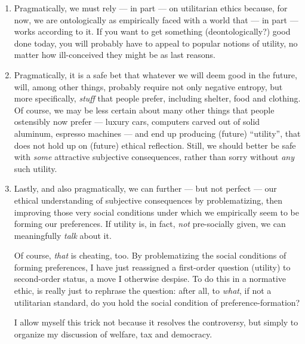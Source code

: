 \begin{enumerate}

	\item 
		Pragmatically, we must rely --- in part --- on utilitarian ethics because, for now, we are ontologically as empirically faced with a world that --- in part --- works according to it.
		If you want to get something (deontologically?) good done today, you will probably have to appeal to popular notions of utility, no matter how ill-conceived they might be as last reasons.

	\item
		Pragmatically, it is a safe bet that whatever we will deem good in the future, will, among other things, probably require not only negative entropy, but more specifically, \emph{stuff} that people prefer, including shelter, food and clothing. 
		Of course, we may be less certain about many other things that people ostensibly now prefer --- luxury cars, computers carved out of solid aluminum, espresso machines --- and end up producing (future) ``utility'', that does not hold up on (future) ethical reflection.
		Still, we should better be safe with \emph{some} attractive subjective consequences, rather than sorry without \emph{any} such utility.

	\item
		Lastly, and also pragmatically, we can further --- but not perfect --- our ethical understanding of subjective consequences by problematizing, then improving those very social conditions under which we empirically seem to be forming our preferences. %
		If utility is, in fact, \emph{not} pre-socially given, we can meaningfully \emph{talk} about it.
		
		Of course, \emph{that} is cheating, too.
		By problematizing the social conditions of forming preferences, I have just reassigned a first-order question (utility) to second-order status, a move I otherwise despise.
		To do this in a normative ethic, is really just to rephrase the question: after all, to \emph{what}, if not a utilitarian standard, do you hold the social condition of preference-formation?
		
		I allow myself this trick not because it resolves the controversy, but simply to organize my discussion of welfare, tax and democracy.
		

\end{enumerate}

